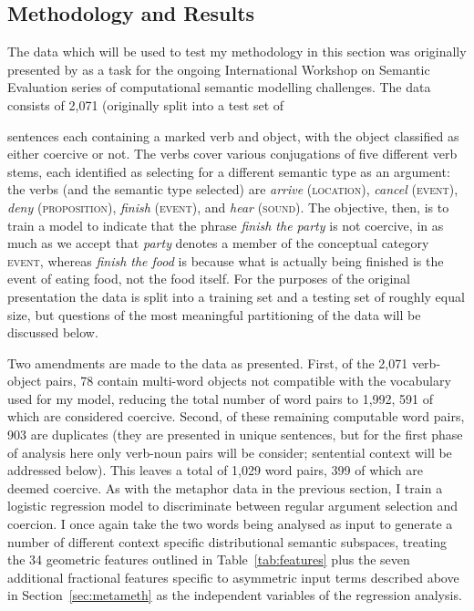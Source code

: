\subsection{Methodology and Results}
The data which will be used to test my methodology in this section was originally presented by \cite{PustejovskyEA2010} as a task for the ongoing International Workshop on Semantic Evaluation series of computational semantic modelling challenges.  The data consists of 2,071 (originally split into a test set of

 sentences each containing a marked verb and object, with the object classified as either coercive or not.  The verbs cover various conjugations of five different verb stems, each identified as selecting for a different semantic type as an argument: the verbs (and the semantic type selected) are \emph{arrive} (\textsc{location}), \emph{cancel} (\textsc{event}), \emph{deny} (\textsc{proposition}), \emph{finish} (\textsc{event}), and \emph{hear} (\textsc{sound}).  The objective, then, is to train a model to indicate that the phrase \emph{finish the party} is not coercive, in as much as we accept that \emph{party} denotes a member of the conceptual category \textsc{event}, whereas \emph{finish the food} is because what is actually being finished is the event of eating food, not the food itself.  For the purposes of the original presentation the data is split into a training set and a testing set of roughly equal size, but questions of the most meaningful partitioning of the data will be discussed below.

Two amendments are made to the data as presented.  First, of the 2,071 verb-object pairs, 78 contain multi-word objects not compatible with the vocabulary used for my model, reducing the total number of word pairs to 1,992, 591 of which are considered coercive.  Second, of these remaining computable word pairs, 903 are duplicates (they are presented in unique sentences, but for the first phase of analysis here only verb-noun pairs will be consider; sentential context will be addressed below).  This leaves a total of 1,029 word pairs, 399 of which are deemed coercive.  As with the metaphor data in the previous section, I train a logistic regression model to discriminate between regular argument selection and coercion.  I once again take the two words being analysed as input to generate a number of different context specific distributional semantic subspaces, treating the 34 geometric features outlined in Table~\ref{tab:features} plus the seven additional fractional features specific to asymmetric input terms described above in Section~\ref{sec:metameth} as the independent variables of the regression analysis.

